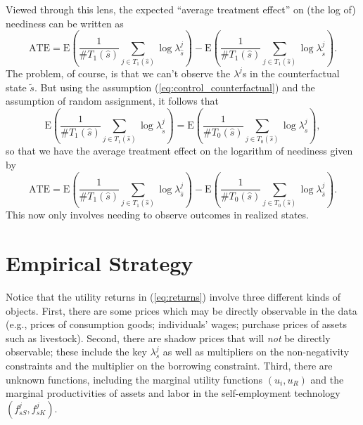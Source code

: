 \documentclass[11pt]{article}
\newcommand{\E}{\ensuremath{\mbox{E}}}
\newcommand{\Eq}[1]{(\ref{eq:#1})}
\begin{document}
Viewed through this lens, the expected ``average treatment effect''
on (the log of) neediness can be written as
\[
   \mbox{ATE}=\E\left(\frac{1}{\#T_1(\hat s)}\sum_{j\in T_1(\hat s)}\log\lambda^j_{\hat s}\right) - \E\left(\frac{1}{\#T_1(\hat s)}\sum_{j\in T_1(\hat s)}\log\lambda^j_{\tilde s} \right).
\]
The problem, of course, is that we can't observe the \(\lambda^j\)s in
the counterfactual state $\tilde s$.  But using the assumption
\Eq{control_counterfactual} and the assumption of random assignment,
it follows that 
\[
   \E\left(\frac{1}{\#T_1(\hat s)}\sum_{j\in T_1(\hat
       s)}\log\lambda^j_{\tilde s} \right)=\E\left(\frac{1}{\#T_0(\hat
       s)}\sum_{j\in T_0(\hat s)}\log\lambda^j_{\hat s} \right), 
\]
so that we have the average treatment effect on the logarithm of
neediness given by 
\begin{equation}
\label{eq:ate}
    \mbox{ATE}=\E\left(\frac{1}{\#T_1(\hat s)}\sum_{j\in T_1(\hat s)}\log\lambda^j_{\hat s}\right) - \E\left(\frac{1}{\#T_0(\hat s)}\sum_{j\in T_0(\hat s)}\log\lambda^j_{\hat s} \right).
\end{equation}
This now only involves needing to observe outcomes in realized states.


\section*{Empirical Strategy}
\label{sec-5}

Notice that the utility returns in \Eq{returns} involve three
different kinds of objects.  First, there are some prices which may be
directly observable in the data (e.g., prices of consumption goods;
individuals' wages; purchase prices of assets such as livestock).
Second, there are shadow prices that will \emph{not} be directly
observable; these include the key $\lambda^j_s$ as well as multipliers
on the non-negativity constraints and the multiplier on the borrowing
constraint.  Third, there are unknown functions, including the
marginal utility functions $(u_i,u_R)$ and the marginal productivities
of assets and labor in the self-employment technology
$(f^j_{sS},f^j_{sK})$.
\end{document}
